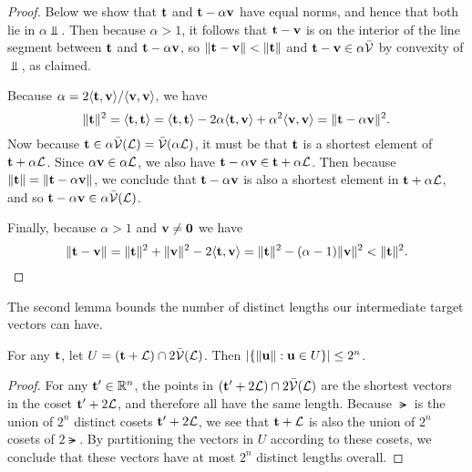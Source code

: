 \documentclass[11pt]{article}
\begin{document}
\begin{proof}
  Below we show that $\vect$ and $\vect-\alpha \vecv$ have equal
  norms, and hence that both lie in $\alpha \Vbar$. Then because
  $\alpha > 1$, it follows that $\vect-\vecv$ is on the interior of
  the line segment between $\vect$ and $\vect - \alpha \vecv$, so
  $\length{\vect - \vecv} < \length{\vect}$ and
  $\vect - \vecv \in \alpha \Vbar$ by convexity of $\Vbar$, as
  claimed.

  Because $\alpha = 2 \inner{\vect, \vecv}/\inner{\vecv, \vecv}$, we
  have
  \begin{equation}
    \length{\vect}^{2} = \inner{\vect,\vect} =
    \inner{\vect, \vect} - 2 \alpha \inner{\vect, \vecv} + \alpha^{2} \inner{\vecv, \vecv}
    = \length{\vect- \alpha \vecv}^{2}. 
  \end{equation}
  Now because $\vect \in \alpha \Vbar(\lat) = \Vbar(\alpha \lat)$, it
  must be that $\vect$ is a shortest element of $\vect + \alpha\lat$.
  Since $\alpha \vecv \in \alpha \lat$, we also have
  $\vect - \alpha \vecv \in \vect + \alpha \lat$. Then because
  $\length{\vect} = \length{\vect - \alpha \vecv}$, we conclude that
  $\vect-\alpha\vecv$ is also a shortest element in
  $\vect + \alpha \lat$, and so
  $\vect-\alpha \vecv \in \alpha \Vbar(\lat)$.

  Finally, because $\alpha > 1$ and $\vecv \neq \veczero$ we have
  \[\length{\vect-\vecv} = \length{\vect}^2 + \length{\vecv}^2 - 2
    \inner{\vect, \vecv} = \length{\vect}^2 - (\alpha-1)
    \length{\vecv}^2 < \length{\vect}^2. \]
\end{proof}

\noindent
The second lemma bounds the number of distinct lengths our
intermediate target vectors can have.

\begin{lemma}
  \label{lem:distinct-lengths}
  For any $\vect$, let $U = (\vect + \lat) \cap 2\Vbar(\lat)$. Then
  $\abs*{ \set*{ \length{\vecu} : \vecu \in U}} \leq 2^n$.
\end{lemma}

\begin{proof}
  For any $\vect' \in \R^n$, the points in
  $(\vect' + 2\lat) \cap 2\Vbar (\lat)$ are the shortest vectors in
  the coset $\vect' + 2\lat$, and therefore all have the same length.
  Because $\lat$ is the union of $2^{n}$ distinct cosets
  $\vect' + 2\lat$, we see that $\vect + \lat$ is also the union of
  $2^n$ cosets of $2\lat$. By partitioning the vectors in $U$
  according to these cosets, we conclude that these vectors have at
  most $2^n$ distinct lengths overall.
\end{proof}
\end{document}
